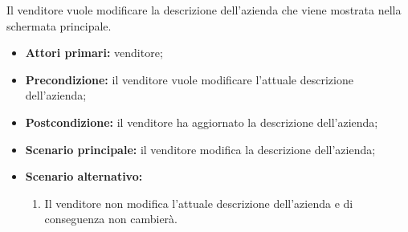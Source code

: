 Il venditore vuole modificare la descrizione dell'azienda che viene mostrata nella schermata principale.
\begin{itemize}
    \item \textbf{Attori primari:} venditore;
    \item \textbf{Precondizione:} il venditore vuole modificare l'attuale descrizione dell'azienda;
    \item \textbf{Postcondizione:} il venditore ha aggiornato la descrizione dell'azienda;
    \item \textbf{Scenario principale:} il venditore modifica la descrizione dell'azienda;
    \item \textbf{Scenario alternativo:}
    \begin{enumerate}[label=\lett]
    	\item Il venditore non modifica l'attuale descrizione dell'azienda e di conseguenza non cambierà.
    \end{enumerate}
\end{itemize}